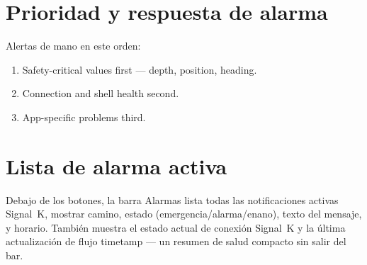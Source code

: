 \section{Prioridad y respuesta de alarma}

Alertas de mano en este orden:

\begin{enumerate}
  \item Safety-critical values first --- depth, position, heading.
  \item Connection and shell health second.
  \item App-specific problems third.
\end{enumerate}

\section{Lista de alarma activa}

Debajo de los botones, la barra Alarmas lista todas las notificaciones activas Signal~K,
mostrar camino, estado (emergencia/alarma/enano), texto del mensaje, y horario.
También muestra el estado actual de conexión Signal~K y la última actualización de flujo
timetamp --- un resumen de salud compacto sin salir del bar.
